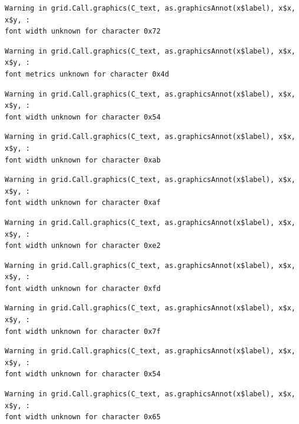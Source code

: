 \documentclass[
  letterpaper,
  DIV=11,
  numbers=noendperiod]{scrreprt}
\begin{document}
\begin{verbatim}
Warning in grid.Call.graphics(C_text, as.graphicsAnnot(x$label), x$x, x$y, :
font width unknown for character 0x72
\end{verbatim}

\begin{verbatim}
Warning in grid.Call.graphics(C_text, as.graphicsAnnot(x$label), x$x, x$y, :
font metrics unknown for character 0x4d
\end{verbatim}

\begin{verbatim}
Warning in grid.Call.graphics(C_text, as.graphicsAnnot(x$label), x$x, x$y, :
font width unknown for character 0x54
\end{verbatim}

\begin{verbatim}
Warning in grid.Call.graphics(C_text, as.graphicsAnnot(x$label), x$x, x$y, :
font width unknown for character 0xab
\end{verbatim}

\begin{verbatim}
Warning in grid.Call.graphics(C_text, as.graphicsAnnot(x$label), x$x, x$y, :
font width unknown for character 0xaf
\end{verbatim}

\begin{verbatim}
Warning in grid.Call.graphics(C_text, as.graphicsAnnot(x$label), x$x, x$y, :
font width unknown for character 0xe2
\end{verbatim}

\begin{verbatim}
Warning in grid.Call.graphics(C_text, as.graphicsAnnot(x$label), x$x, x$y, :
font width unknown for character 0xfd
\end{verbatim}

\begin{verbatim}
Warning in grid.Call.graphics(C_text, as.graphicsAnnot(x$label), x$x, x$y, :
font width unknown for character 0x7f
\end{verbatim}

\begin{verbatim}
Warning in grid.Call.graphics(C_text, as.graphicsAnnot(x$label), x$x, x$y, :
font width unknown for character 0x54
\end{verbatim}

\begin{verbatim}
Warning in grid.Call.graphics(C_text, as.graphicsAnnot(x$label), x$x, x$y, :
font width unknown for character 0x65
\end{verbatim}
\end{document}
